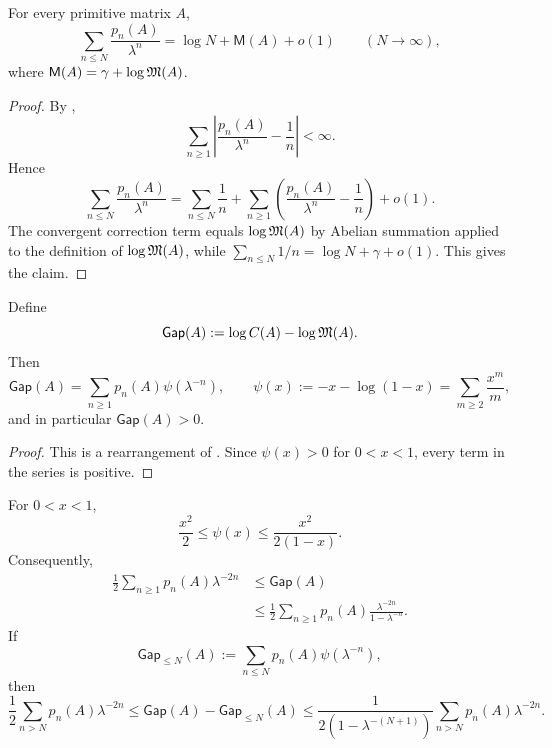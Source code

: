 \begin{corollary}
  \label{cor:finite-part-mertens-asymptotic}
  For every primitive matrix \(A\),
  \[
    \sum_{n\le N}\frac{p_n(A)}{\lambda^n}
    =\log N+\mathsf M(A)+o(1)
    \qquad (N\to\infty),
  \]
  where \(\mathsf M(A)=\gamma+\log\mathfrak{M}(A)\).
\end{corollary}

\begin{proof}
  By ,
  \[
    \sum_{n\ge 1}\left|\frac{p_n(A)}{\lambda^n}-\frac{1}{n}\right|
    <\infty.
  \]
  Hence
  \[
    \sum_{n\le N}\frac{p_n(A)}{\lambda^n}
    =\sum_{n\le N}\frac{1}{n}
      +\sum_{n\ge 1}\left(\frac{p_n(A)}{\lambda^n}-\frac{1}{n}\right)
      +o(1).
  \]
  The convergent correction term equals \(\log\mathfrak{M}(A)\) by Abelian
  summation applied to the definition of \(\log\mathfrak{M}(A)\), while
  \(\sum_{n\le N}1/n=\log N+\gamma+o(1)\). This gives the claim.
\end{proof}

\begin{corollary}
  \label{cor:finite-part-gap-positive}
  Define
  \[
    \mathsf{Gap}(A):=\log C(A)-\log\mathfrak{M}(A).
  \]
  Then
  \[
    \mathsf{Gap}(A)
    =\sum_{n\ge 1}p_n(A)\psi(\lambda^{-n}),
    \qquad
    \psi(x):=-x-\log(1-x)=\sum_{m\ge 2}\frac{x^m}{m},
  \]
  and in particular \(\mathsf{Gap}(A)>0\).
\end{corollary}

\begin{proof}
  This is a rearrangement of
  . Since \(\psi(x)>0\) for
  \(0<x<1\), every term in the series is positive.
\end{proof}

\begin{proposition}
  \label{prop:finite-part-gap-truncation}
  For \(0<x<1\),
  \[
    \frac{x^2}{2}\le \psi(x)\le \frac{x^2}{2(1-x)}.
  \]
  Consequently,
  \begin{align*}
    \frac12\sum_{n\ge 1}p_n(A)\lambda^{-2n}
    &\le \mathsf{Gap}(A) \\
    &\le \frac12\sum_{n\ge 1}
      p_n(A)\frac{\lambda^{-2n}}{1-\lambda^{-n}}.
  \end{align*}
  If
  \[
    \mathsf{Gap}_{\le N}(A)
    :=\sum_{n\le N}p_n(A)\psi(\lambda^{-n}),
  \]
  then
  \[
    \frac12\sum_{n>N}p_n(A)\lambda^{-2n}
    \le \mathsf{Gap}(A)-\mathsf{Gap}_{\le N}(A)
    \le
    \frac{1}{2(1-\lambda^{-(N+1)})}
      \sum_{n>N}p_n(A)\lambda^{-2n}.
  \]
\end{proposition}

